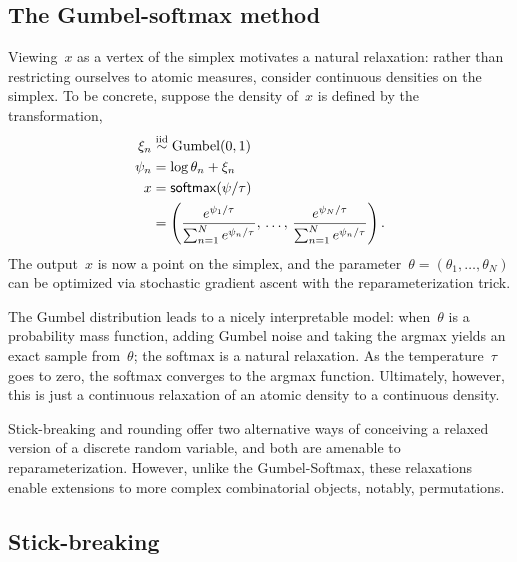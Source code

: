 \documentclass[twoside]{article}
\begin{document}
\subsection{The Gumbel-softmax method}
Viewing~$x$ as a vertex of the simplex motivates a natural relaxation:
rather than restricting ourselves to atomic measures,
consider continuous densities on the simplex. To be concrete, suppose
the density of~$x$ is defined by the transformation,
\begin{align*}
  \xi_n &\stackrel{\text{iid}}{\sim} \mathrm{Gumbel}(0, 1) \\
  \psi_n & = \log \theta_n + \xi_n  \\
  x &=  \mathsf{softmax}(\psi / \tau) \\
        &=\left(\frac{e^{\psi_1 / \tau}}{\sum_{n=1}^N e^{\psi_n / \tau}},
      \,\ldots,\,
      \frac{e^{\psi_N / \tau}}{\sum_{n=1}^N e^{\psi_n / \tau}} \right).
\end{align*}
The output~$x$ is now a point on the simplex, and the
parameter~${\theta = (\theta_1, \ldots, \theta_N)}$ can be optimized
via stochastic gradient ascent with the reparameterization trick.

The Gumbel distribution leads to a nicely interpretable model:
when~$\theta$ is a probability mass function, adding Gumbel noise and
taking the argmax yields an exact sample from~$\theta$; the softmax is
a natural relaxation. As the temperature~$\tau$ goes to zero, the
softmax converges to the argmax function. Ultimately, however, this is
just a continuous relaxation of an atomic density to a continuous
density.

Stick-breaking and rounding offer two alternative ways of conceiving a
relaxed version of a discrete random variable, and both are amenable
to reparameterization. However, unlike the Gumbel-Softmax, these
relaxations enable extensions to more complex combinatorial objects,
notably, permutations.

\subsection{Stick-breaking}
\end{document}
